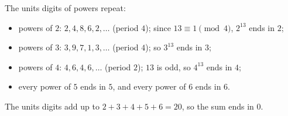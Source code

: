 The units digits of powers repeat:
\begin{itemize}
\item powers of $2$: $2,4,8,6,2,\dots$ (period $4$); since $13\equiv1\pmod4$, $2^{13}$ ends in $2$;
\item powers of $3$: $3,9,7,1,3,\dots$ (period $4$); so $3^{13}$ ends in $3$;
\item powers of $4$: $4,6,4,6,\dots$ (period $2$); $13$ is odd, so $4^{13}$ ends in $4$;
\item every power of $5$ ends in $5$, and every power of $6$ ends in $6$.
\end{itemize}
The units digits add up to $2+3+4+5+6=20$, so the sum ends in $\boxed{0}$.
